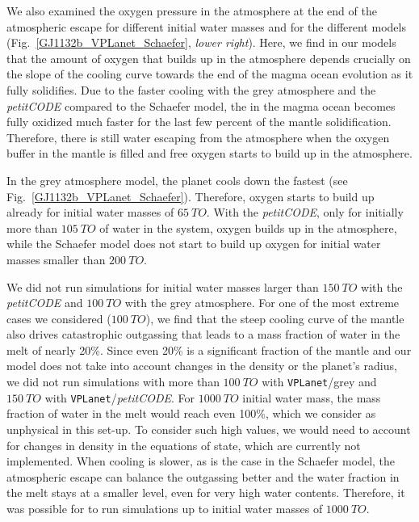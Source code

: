 \documentclass[oneside,twocolumn]{article}
\newcommand{\vplanet}{\texttt{\footnotesize{VPLanet}}}
\newcommand{\petit}{\textit{petitCODE}}
\begin{document}
We also examined the oxygen pressure in the atmosphere at the end of the atmospheric escape for different initial water masses and for the different models (Fig.~\ref{GJ1132b_VPLanet_Schaefer}, \textit{lower right}). Here, we find in our models that the amount of oxygen that builds up in the atmosphere depends crucially on the slope of the cooling curve towards the end of the magma ocean evolution as it fully solidifies.  Due to the faster cooling with the grey atmosphere and the \petit{} compared to the Schaefer model, the  in the magma ocean becomes fully oxidized much faster for the last few percent of the mantle solidification. Therefore, there is still water escaping from the atmosphere when the oxygen buffer in the mantle is filled and free oxygen starts to build up in the atmosphere.

In the grey atmosphere model, the planet cools down the fastest (see Fig.~\ref{GJ1132b_VPLanet_Schaefer}).
Therefore, oxygen starts to build up already for initial water masses of $\SI{65}{TO}$. 
With the \petit{}, only for initially more than $\SI{105}{TO}$ of water in the system, oxygen builds up in the atmosphere, while the Schaefer model does not start to build up oxygen for initial water masses smaller than $\SI{200}{TO}$.

We did not run simulations for initial water masses larger than $\SI{150}{TO}$ with the \petit{} and $\SI{100}{TO}$ with the grey atmosphere. For one of the most extreme cases we considered ($\SI{100}{TO}$), we find that the steep cooling curve of the mantle also drives catastrophic outgassing that leads to a mass fraction of water in the melt of nearly 20\%. Since even 20\% is a significant fraction of the mantle and our model does not take into account changes in the density or the planet's radius, we did not run simulations with more than $\SI{100}{TO}$ with \vplanet{}/grey and $\SI{150}{TO}$ with \vplanet{}/\petit{}. For $\SI{1000}{TO}$ initial water mass, the mass fraction of water in the melt would reach even 100\%, which we consider as unphysical in this set-up. To consider such high values, we would need to account for changes in density in the equations of state, which are currently not implemented.
When cooling is slower, as is the case in the Schaefer model, the atmospheric escape can balance the outgassing better and the water fraction in the melt stays at a smaller level, even for very high water contents. Therefore, it was possible for \citet{Schaefer2016} to run simulations up to initial water masses of $\SI{1000}{TO}$.
\end{document}
